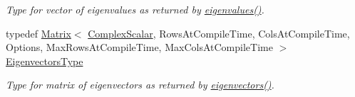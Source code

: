 \begin{DoxyCompactItemize}
\begin{DoxyCompactList}\small\item\em Type for vector of eigenvalues as returned by \hyperlink{group___eigenvalues___module_a114189009e42f5e03372a7a3dfa33b97}{eigenvalues()}. \end{DoxyCompactList}\item 
typedef \hyperlink{group___core___module_class_eigen_1_1_matrix}{Matrix}$<$ \hyperlink{group___eigenvalues___module_a4d0b2a773357d0a6ec98e026f04002ed}{Complex\+Scalar}, Rows\+At\+Compile\+Time, Cols\+At\+Compile\+Time, Options, Max\+Rows\+At\+Compile\+Time, Max\+Cols\+At\+Compile\+Time $>$ \hyperlink{group___eigenvalues___module_aa140354e2f7d5ce34c6488c39e19f2c2}{Eigenvectors\+Type}
\begin{DoxyCompactList}\small\item\em Type for matrix of eigenvectors as returned by \hyperlink{group___eigenvalues___module_a66288022802172e3ee059283b26201d7}{eigenvectors()}. \end{DoxyCompactList}\end{DoxyCompactItemize}
